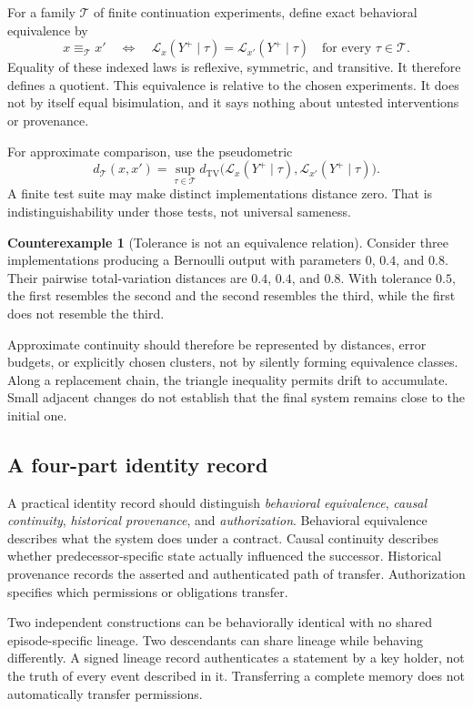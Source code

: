 \documentclass[11pt,letterpaper]{article}
\theoremstyle{plain}
\theoremstyle{definition}
\newtheorem{counterexample}[proposition]{Counterexample}
\theoremstyle{remark}
\newcommand{\TV}{d_{\mathrm{TV}}}
\newcommand{\Law}{\mathcal L}
\begin{document}
For a family $\mathcal T$ of finite continuation experiments, define exact behavioral equivalence by
\[
x\equiv_{\mathcal T}x'\quad\Longleftrightarrow\quad
\Law_x(Y^+\mid\tau)=\Law_{x'}(Y^+\mid\tau)
\quad\text{for every }\tau\in\mathcal T.
\]
Equality of these indexed laws is reflexive, symmetric, and transitive. It therefore defines a quotient. This equivalence is relative to the chosen experiments. It does not by itself equal bisimulation, and it says nothing about untested interventions or provenance.

For approximate comparison, use the pseudometric
\[
d_{\mathcal T}(x,x')=\sup_{\tau\in\mathcal T}
\TV\bigl(\Law_x(Y^+\mid\tau),\Law_{x'}(Y^+\mid\tau)\bigr).
\]
A finite test suite may make distinct implementations distance zero. That is indistinguishability under those tests, not universal sameness.

\begin{counterexample}[Tolerance is not an equivalence relation]\label{ex:identity}
Consider three implementations producing a Bernoulli output with parameters $0$, $0.4$, and $0.8$. Their pairwise total-variation distances are $0.4$, $0.4$, and $0.8$. With tolerance $0.5$, the first resembles the second and the second resembles the third, while the first does not resemble the third.
\end{counterexample}

Approximate continuity should therefore be represented by distances, error budgets, or explicitly chosen clusters, not by silently forming equivalence classes. Along a replacement chain, the triangle inequality permits drift to accumulate. Small adjacent changes do not establish that the final system remains close to the initial one.

\subsection{A four-part identity record}
A practical identity record should distinguish \emph{behavioral equivalence}, \emph{causal continuity}, \emph{historical provenance}, and \emph{authorization}. Behavioral equivalence describes what the system does under a contract. Causal continuity describes whether predecessor-specific state actually influenced the successor. Historical provenance records the asserted and authenticated path of transfer. Authorization specifies which permissions or obligations transfer.

Two independent constructions can be behaviorally identical with no shared episode-specific lineage. Two descendants can share lineage while behaving differently. A signed lineage record authenticates a statement by a key holder, not the truth of every event described in it. Transferring a complete memory does not automatically transfer permissions.
\end{document}
